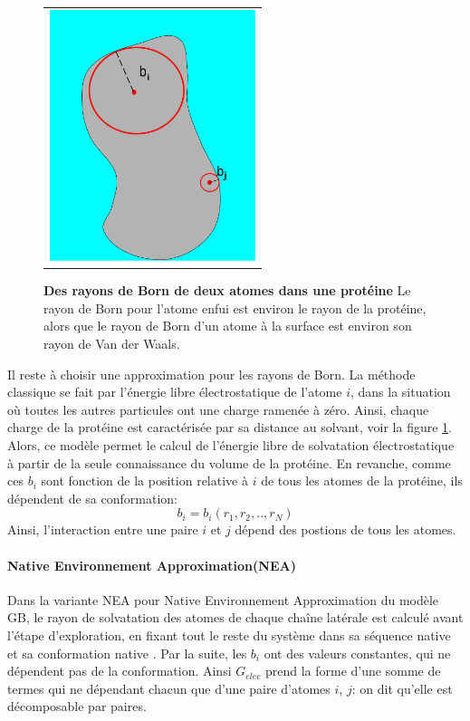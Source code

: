    \begin{figure}[!htbp]
     \centering
     \begin{tabular}{c}
       \includegraphics[width=6cm]{figure/rayon_Born.pdf} &
     \end{tabular}
     
     \caption{\textbf{Des rayons de Born de deux atomes dans une protéine} Le rayon de Born pour l'atome enfui est environ le rayon de la protéine, alors que le rayon de Born d'un atome à la surface est environ son rayon de Van der Waals.} 
\label{graph:rayonBorn}
   \end{figure}

Il reste à choisir une approximation pour les rayons de Born. La méthode classique se fait par l'énergie libre électrostatique de l'atome $i$, dans la situation où toutes les autres particules ont une charge ramenée à zéro. Ainsi, chaque charge de la protéine est caractérisée par sa distance au solvant, voir la figure \ref{graph:rayonBorn}. Alors, ce modèle permet le calcul de l'énergie libre de solvatation électrostatique à partir de la seule connaissance du volume de la protéine. En revanche, comme ces $b_i$ sont fonction de la position relative à $i$ de tous les atomes de la protéine, ils dépendent de sa conformation:
\begin{displaymath}
b_i=b_i(r_1,r_2,..,r_N)
\end{displaymath}
Ainsi, l'interaction entre une paire $i$ et $j$ dépend des postions de tous les atomes.
\paragraph{\og Native Environnement Approximation\fg (NEA)}
\label{NEA}
Dans la variante NEA pour \og Native Environnement Approximation \fg  du modèle GB, le rayon de solvatation des atomes de chaque chaîne latérale est calculé avant l'étape d'exploration, en fixant tout le reste du système dans sa séquence native et sa conformation native \cite{Polydorides11,Simonson13,Gaillard14}. Par la suite, les $b_i$ ont des valeurs constantes, qui ne dépendent pas de la conformation. Ainsi $G_{elec}$ prend la forme d'une somme de termes qui ne dépendant chacun que d'une paire d'atomes $i$, $j$: on dit qu'elle est \og décomposable par paires\fg.

